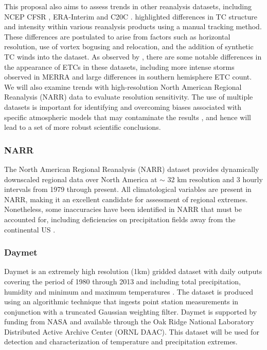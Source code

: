 \documentclass[11pt]{article}
\begin{document}
This proposal also aims to assess trends in other reanalysis datasets, including NCEP CFSR \citep{saha2010ncep}, ERA-Interim \citep{simmons2007era} and C20C \citep{compo2011twentieth}. \citet{Schenkel2012} highlighted differences in TC structure and intensity within various reanalysis products using a manual tracking method. These differences are postulated to arise from factors such as horizontal resolution, use of vortex bogusing and relocation, and the addition of synthetic TC winds into the dataset. As observed by \cite{hodges2011comparison}, there are some notable differences in the appearance of ETCs in these datasets, including more intense storms observed in MERRA and large differences in southern hemisphere ETC count.  We will also examine trends with high-resolution North American Regional Reanalysis (NARR) data to evaluate resolution sensitivity.  The use of multiple datasets is important for identifying and overcoming biases associated with specific atmospheric models that may contaminate the results \citep{jun2008spatial}, and hence will lead to a set of more robust scientific conclusions.

\subsubsection*{NARR} \label{sec:NARR}

The North American Regional Reanalysis (NARR) dataset \citep{mesinger2006north} provides dynamically downscaled regional data over North America at $\sim$ 32 km resolution and 3 hourly intervals from 1979 through present.  All climatological variables are present in NARR, making it an excellent candidate for assessment of regional extremes.  Nonetheless, some inaccuracies have been identified in NARR that must be accounted for, including deficiencies on precipitation fields away from the continental US \citep{bukovsky2007brief}.

\subsubsection*{Daymet} \label{sec:DAYMET}

Daymet is an extremely high resolution (1km) gridded dataset with daily outputs covering the period of 1980 through 2013 and including total precipitation, humidity and minimum and maximum temperatures \citep{thornton1997generating, thornton1999improved, thornton2000simultaneous}.  The dataset is produced using an algorithmic technique that ingests point station measurements in conjunction with a truncated Gaussian weighting filter.  Daymet is supported by funding from NASA and available through the Oak Ridge National Laboratory Distributed Active Archive Center (ORNL DAAC).  This dataset will be used for detection and characterization of temperature and precipitation extremes.
\end{document}
